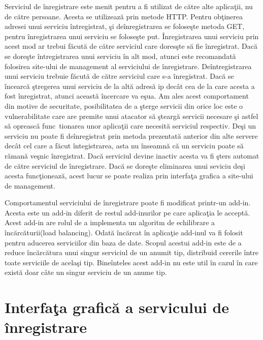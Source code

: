 \documentclass[a4paper,12pt]{report}
\begin{document}
Serviciul de \^inregistrare este menit pentru a fi utilizat de c\u atre alte aplica\c tii, nu de c\u atre persoane.
Acesta se utilizeaz\u a prin metode HTTP. Pentru ob\c tinerea adresei unui serviciu \^intregistrat, \c si de\^inregistrarea
 se folose\c ste metoda GET, pentru \^inregistrarea unui serviciu se folose\c ste put.
\^Inregistrarea unui serviciu prin acest mod ar trebui f\u acut\u a de c\u atre serviciul care dores\c ste 
s\u a fie \^inregistrat. Dac\u a se dore\c ste \^intregistrarea unui serviciu \^in alt mod, atunci este recomandat\u a 
folosirea site-ului de management al serviciului de \^inregistrare.
De\^intregistrarea unui serviciu trebuie f\u acut\u a de c\u atre serviciul care s-a \^inregistrat. Dac\u a 
se \^incearc\u a \c stregerea unui serviciu de la alt\u a adres\u a ip dec\^at cea de la care acesta a fost \^inregistrat,
atunci aceast\u a \^incercare va e\c sua. Am ales acest comportament din motive de securitate, posibilitatea de 
a \c sterge servicii din orice loc este o vulnerabilitate care are premite unui atacator s\u a \c stearg\u a 
servicii necesare \c si astfel s\u a opreasc\u a func\ tionarea unor aplica\c tii care necesit\u a serviciul respectiv.
De\c si un serviciu nu poate fi de\^inregistrat prin metoda prezentat\u a anterior din alte servere dec\^at cel care a 
f\u acut \^integistrarea, asta nu \^inseamn\u a c\u a un serviciu poate s\u a r\u aman\u a ve\c snic \^inregistrat.
Dac\u a serviciul devine inactiv acesta va fi \c sters automat de c\u atre serviciul de \^inregistrare.
Dac\u a se dore\c ste eliminarea unui seviciu de\c si acesta func\c tioneaz\u a, acest lucur se poate realiza prin 
interfa\c ta grafica a site-ului de management.  

Comportamentul serviciului de \^inregistrare poate fi modificat printr-un add-in.
Acesta este un add-in diferit de restul add-inurilor pe care aplica\c tia le accept\u a.
Acest add-in are rolul de a implementa un algoritm de echilibrare a \^inc\u arc\u aturii(load balancing).
Odat\u a \^inc\u arcat \^in aplica\c tie add-inul va fi folosit pentru aducerea serviciilor din
baza de date. Scopul acestui add-in este de a reduce \^inc\u arc\u atura unui singur 
serviciul de un anumit tip, distribuid cererile \^intre toate serviciile de acela\c si tip.
Bine\^inteles acest add-in nu este util \^in cazul \^in care exist\u a doar c\^ate un singur 
serviciu de un anume tip.

\section{Interfa\c ta grafic\u a a servicului de \^inregistrare}
\end{document}
